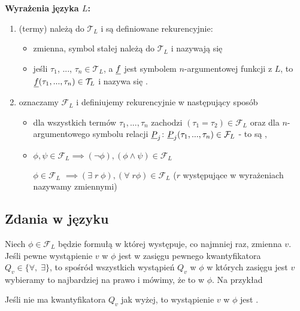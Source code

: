 \textbf{Wyrażenia języka $L$:}
\begin{enumerate}[label=\alph*)]
  \item {} (termy) należą do $\mathcal{T}_L$ i są definiowane rekurencyjnie:
    \begin{itemize}
      \item zmienna, symbol stałej należą do $\mathcal{T}_L$ i nazywają się 
      \item jeśli $\tau_1$, ..., $\tau_n\in \mathcal{T}_L$, a $\underline{f}$ jest symbolem $n$-argumentowej funkcji z $L$, to $\underline{f}(\tau_1,...,\tau_n)\in \mathcal{T}_L$ i nazywa się . 
    \end{itemize}
  \item {} oznaczamy $\mathcal{F}_L$ i definiujemy rekurencyjnie w następujący sposób
    \begin{itemize}
      \item dla wszystkich termów $\tau_1,...,\tau_n$ zachodzi $(\tau_1=\tau_2)\in \mathcal{F}_L$ oraz dla $n$-argumentowego symbolu relacji $\underline{P}_j$: $\underline{P}_j(\tau_1,...,\tau_n)\in  \mathcal{F}_L$ - to są ,
      \item $\phi,\psi\in\mathcal{F}_L\implies (\neg \phi), (\phi\land\psi)\in \mathcal{F}_L$

        $\phi\in \mathcal{F}_L$ $\implies (\exists\;r\;\phi),(\forall\;r\phi)\in\mathcal{F}_L$ ($r$ występujące w wyrażeniach nazywamy zmiennymi)
    \end{itemize}
\end{enumerate}

\subsection{Zdania w języku}

Niech $\phi\in \mathcal{F}_L$ będzie formułą w której występuje, co najmniej raz, zmienna $v$. Jeśli pewne wystąpienie $v$ w $\phi$ jest w zasięgu pewnego kwantyfikatora $Q_v\in\{\forall,\;\exists\}$, to spośród wszystkich wystąpień $Q_v$ w $\phi$ w których zasięgu jest $v$ wybieramy to najbardziej na prawo i mówimy, że to  w $\phi$. Na przykład
\begin{center}
\end{center}
Jeśli nie ma kwantyfikatora $Q_v$ jak wyżej, to wystąpienie $v$ w $\phi$ jest .

